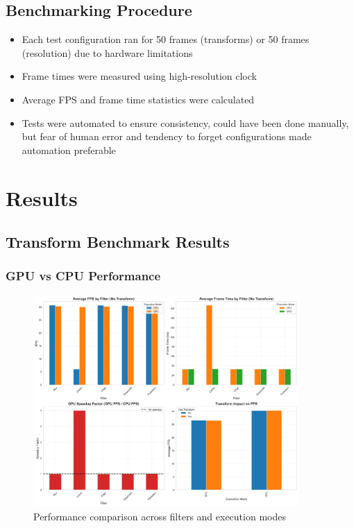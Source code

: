 \documentclass[12pt,a4paper]{article}
\begin{document}
\subsection{Benchmarking Procedure}
\begin{itemize}
    \item Each test configuration ran for 50 frames (transforms) or 50 frames (resolution) due to hardware limitations
    \item Frame times were measured using high-resolution clock
    \item Average FPS and frame time statistics were calculated
    \item Tests were automated to ensure consistency, could have been done manually, but fear of human error and tendency to forget configurations made automation preferable
\end{itemize}

\section{Results}

\subsection{Transform Benchmark Results}

\subsubsection{GPU vs CPU Performance}
\begin{figure}[H]
    \centering
    \includegraphics[width=0.9\textwidth]{../data/plots/performance_comparison_transforms.png}
    \caption{Performance comparison across filters and execution modes}
    \label{fig:transform_comparison}
\end{figure}
\end{document}
